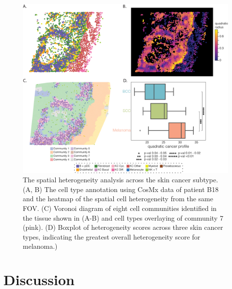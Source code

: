 \begin{figure}
    \centering
    \includegraphics[width=0.8\columnwidth]{Chapter4/Figures/Chap4_figure_2.png}
    \caption[The spatial heterogeneity analysis across the skin cancer subtype]{The spatial heterogeneity analysis across the skin cancer subtype. (A, B) The cell type annotation using CosMx data of patient B18 and the heatmap of the spatial cell heterogeneity from the same FOV. (C) Voronoi diagram of eight cell communities identified in the tissue shown in (A-B) and cell types overlaying of community 7 (pink). (D) Boxplot of heterogeneity scores across three skin cancer types, indicating the greatest overall heterogeneity score for melanoma.)}
    \label{Chap4:fig1}
    
\end{figure}



\section{Discussion}

